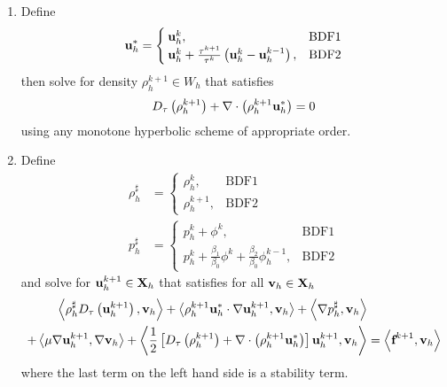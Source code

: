 \documentclass[letterpaper]{erdc}
\begin{document}
\begin{enumerate}
\item Define
\begin{equation}
  \textbf{u}_h^{*} = \begin{cases}
                \textbf{u}_h^{k}, & \mbox{BDF1} \\
                \textbf{u}_h^{k} + \frac{\tau^{k+1}}{\tau^k}\left( \textbf{u}_h^{k} - \textbf{u}_h^{k-1}\right), & \mbox{BDF2} 
               \end{cases}
 \end{equation}
then solve for density $\rho_h^{k+1}\in W_h$ that satisfies
\begin{equation}\label{eqn:generaldensity}
D_{\tau}\left(\rho_h^{k+1}\right) + \nabla\cdot\left( \rho_h^{k+1}\textbf{u}_h^{*} \right) = 0
\end{equation}
using any monotone hyperbolic scheme of appropriate order. 

\item Define
\begin{align}
  \rho_h^{\sharp} &= \begin{cases}
                       \rho_h^{k}, & \mbox{BDF1} \\
                       \rho_h^{k+1}, & \mbox{BDF2} 
                      \end{cases}\\
  p_h^{\sharp} &= \begin{cases}
                  p_h^{k} + \phi^{k}, & \mbox{BDF1}\\ 
                  p_h^{k} + \frac{\beta_1}{\beta_0}\phi^{k} + \frac{\beta_2}{\beta_0}\phi_h^{k-1}, & \mbox{BDF2} 
                 \end{cases}
\end{align}
and solve for $\textbf{u}_h^{k+1}\in\textbf{X}_h$ that satisfies for all $\textbf{v}_h\in\textbf{X}_h$
\begin{equation}\label{eqn:generalvelocity}
  \begin{split}
    \left\langle \rho_h^{\sharp}D_{\tau}\left(\textbf{u}_h^{k+1}\right), \textbf{v}_h \right\rangle  + \left\langle \rho_h^{k+1}\textbf{u}_h^{*}\cdot\nabla\textbf{u}_h^{k+1}, \textbf{v}_h \right\rangle +\left\langle \nabla p_h^{\sharp}, \textbf{v}_h \right\rangle &\\
     + \left\langle \mu\nabla\textbf{u}_h^{k+1}, \nabla\textbf{v}_h \right\rangle  + \left\langle \frac{1}{2}\left[ D_{\tau}\left(\rho_h^{k+1}\right) + \nabla\cdot\left( \rho_h^{k+1}\textbf{u}_h^{*} \right)\right] \textbf{u}_h^{k+1}, \textbf{v}_h \right\rangle &= \left\langle \textbf{f}^{k+1}, \textbf{v}_h \right\rangle
  \end{split}
\end{equation}
where the last term on the left hand side is a stability term.  


\end{enumerate}
\end{document}
